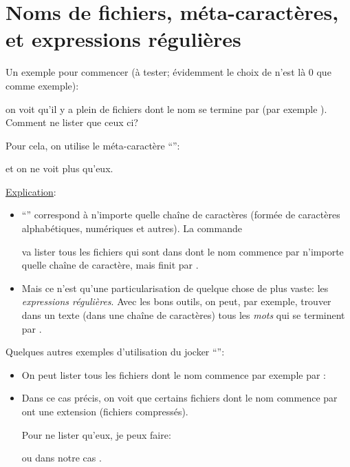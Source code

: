 \section{Noms de fichiers, méta-caractères, et expressions régulières}
Un exemple pour commencer (à tester; évidemment le choix de
 n'est là 0
que comme exemple):\label{regular}


\noindent on voit qu'il y a  plein de fichiers dont le nom se termine par
 (par exemple ). Comment ne lister que ceux ci?

Pour cela, on utilise le méta-caractère
``\ttt{*}'':


et on ne voit plus qu'eux.

\underline{Explication}:
\begin{itemize}

\item ``\ttt{*}'' correspond à n'importe quelle chaîne de caractères
(formée de caractères alphabétiques, numériques et autres).
  La commande


  va  lister tous les fichiers qui
sont dans 
  dont le nom commence par n'importe quelle chaîne de
caractère, mais finit par . 
\item Mais ce n'est qu'une particularisation de quelque chose de plus
  vaste: les \emph{expressions régulières}. Avec les  \og bons \fg{}
  outils, on peut, par exemple, trouver dans un texte (dans une chaîne
  de caractères) tous les   \emph{mots} qui se terminent par .
\end{itemize}


 Quelques autres exemples d'utilisation du jocker ``\ttt{*}'':
\begin{itemize}
\item On peut lister
tous les fichiers dont le nom commence par exemple par :


\item Dans ce cas précis, on voit que certains fichiers dont le nom
  commence par  ont une extension   (fichiers compressés).

  Pour ne lister qu'eux, je peux faire:

 ou dans notre cas .
\end{itemize}\smallskip


